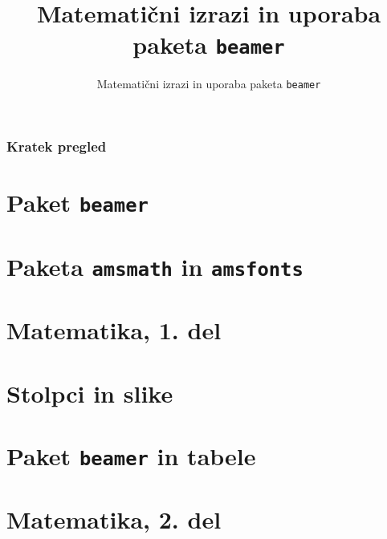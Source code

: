 \documentclass{beamer}
\begin{document}


\title{Matematični izrazi in uporaba paketa \texttt{beamer}}
\subtitle{Matematični izrazi in uporaba paketa \texttt{beamer}}
\date{}

\begin{frame}
    \titlepage
\end{frame}

\begin{frame}
    \frametitle{Kratek pregled}
    \tableofcontents%
\end{frame}


\section{Paket \texttt{beamer}}


\section{Paketa \texttt{amsmath} in \texttt{amsfonts}}


\section[Matematika, 1. del\\\large{Analiza, logika, množice}]{Matematika, 1. del}


\section{Stolpci in slike}

\section{Paket \texttt{beamer} in tabele}

\section[Matematika, 2. del\\\large{Zaporedja, algebra, grupe}]{Matematika, 2. del}
\end{document}
